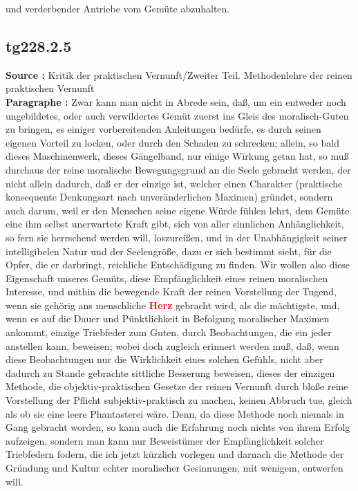 \documentclass[a4paper,12pt,twoside]{book}
\newcommand{\match}[1]{\textcolor{red}{\textbf{#1}}}
\begin{document}
und verderbender Antriebe vom Gemüte abzuhalten. 
	
	\subsection*{tg228.2.5} 
	\textbf{Source : }Kritik der praktischen Vernunft/Zweiter Teil. Methodenlehre der reinen praktischen Vernunft\\  
	
	\noindent\textbf{Paragraphe : }Zwar kann man nicht in Abrede sein, daß, um ein entweder noch ungebildetes, oder auch verwildertes Gemüt zuerst ins Gleis des moralisch-Guten zu bringen, es einiger vorbereitenden Anleitungen bedürfe, es durch seinen eigenen Vorteil zu locken, oder durch den Schaden zu schrecken; allein, so bald dieses Maschinenwerk, dieses Gängelband, nur einige Wirkung getan hat, so muß durchaus der reine moralische Bewegungsgrund an die Seele gebracht werden, der nicht allein dadurch, daß er der einzige ist, welcher einen Charakter (praktische konsequente Denkungsart nach unveränderlichen Maximen) gründet, sondern auch darum, weil er den Menschen seine eigene Würde fühlen lehrt, dem Gemüte eine ihm selbst unerwartete Kraft gibt, sich von aller sinnlichen Anhänglichkeit, so fern sie herrschend werden will, loszureißen, und in der Unabhängigkeit seiner intelligibelen Natur und der Seelengröße, dazu er sich bestimmt sieht, für die Opfer, die er darbringt, reichliche Entschädigung zu finden. Wir wollen also diese Eigenschaft unseres Gemüts, diese Empfänglichkeit eines reinen moralischen Interesse, und mithin die bewegende Kraft der reinen Vorstellung der Tugend, wenn sie gehörig ans menschliche \match{Herz} gebracht wird, als die mächtigste, und, wenn es auf die Dauer und Pünktlichkeit in Befolgung moralischer Maximen ankommt, einzige Triebfeder zum Guten, durch Beobachtungen, die ein jeder anstellen kann, beweisen; wobei doch zugleich erinnert werden muß, daß, wenn diese Beobachtungen nur die Wirklichkeit eines solchen Gefühls, nicht aber dadurch zu Stande gebrachte sittliche Besserung beweisen, dieses der einzigen Methode, die objektiv-praktischen Gesetze der reinen Vernunft durch bloße reine Vorstellung der Pflicht subjektiv-praktisch zu machen, keinen Abbruch tue, gleich als ob sie eine leere Phantasterei wäre. Denn, da diese Methode noch niemals in Gang gebracht worden, so kann auch die Erfahrung noch nichts von ihrem Erfolg aufzeigen, sondern man kann nur Beweistümer der Empfänglichkeit solcher Triebfedern fodern, die ich jetzt kürzlich vorlegen und darnach die Methode der Gründung und Kultur echter moralischer Gesinnungen, mit wenigem, entwerfen will. 
	
\end{document}

